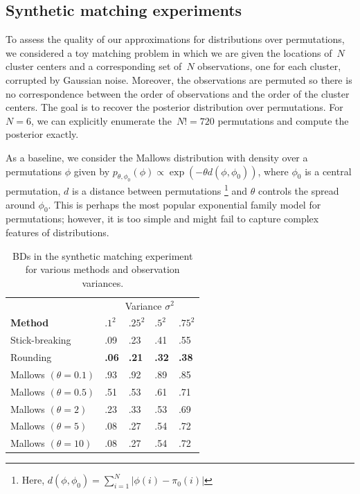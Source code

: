 \documentclass[twoside]{article}
\begin{document}

 \subsection{Synthetic matching experiments}
 To assess the quality of our approximations for distributions over
 permutations, we considered a toy matching problem in which we are given the locations of~$N$ cluster centers and a corresponding set of~$N$
 observations, one for each cluster, corrupted by Gaussian noise.
 Moreover, the observations are permuted so there is no correspondence
 between the order of observations and the order of the cluster centers.
 The goal is to recover the posterior distribution over permutations.
 For~$N=6$, we can explicitly enumerate the~$N!=720$ permutations and
 compute the posterior exactly. 
 
 As a baseline, we consider the Mallows distribution  \cite{Mallows1957} with density over a permutations $\phi$ given by $p_{\theta, \phi_0}(\phi)\propto \exp(-\theta d(\phi,\phi_0))$, where $\phi_0$ is a central permutation, $d$ is a distance between permutations \footnote{Here, $d(\phi,\phi_0)=\sum_{i=1}^N |\phi(i)-\pi_0(i)|$} and $\theta$ controls the spread around $\phi_0$. This is perhaps the most popular exponential family model for permutations; however, it is too simple and might fail to capture complex features of distributions.

 \begin{table}[h]
  \caption{BDs in the synthetic matching experiment for various methods and observation variances.}
  \label{table:BDs}
  \centering
  \begin{tabular}{lllll}
    & \multicolumn{4}{c}{Variance $\sigma^2$} \\
    \cmidrule(lr){3-4} 
    \textbf{Method} & $.1^2$ & $.25^2$ & $.5^2$ & $.75^2$ \\
    \hline
    Stick-breaking & .09 & .23 & .41 & .55 \\
    Rounding & \textbf{.06} & \textbf{.21}  & \textbf{.32}  & \textbf{.38} \\
    Mallows $(\theta=0.1)$ & .93 & .92 & .89  & .85 \\
    Mallows $(\theta=0.5)$ & .51 & .53  & .61 & .71 \\
    Mallows $(\theta=2)$ & .23 & .33 & .53  & .69 \\
    Mallows $(\theta=5)$ & .08 & .27 & .54 & .72 \\
    Mallows $(\theta=10)$ & .08 & .27 & .54  & .72 \\
    \bottomrule
  \end{tabular}
\end{table}
\end{document}

